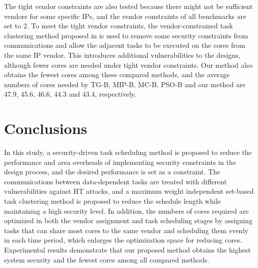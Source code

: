 \documentclass[10pt,journal, compsoc]{IEEEtran}
\begin{document}
The tight vendor constraints are also tested because there might not be sufficient vendors for some specific IPs, and the vendor constraints of all benchmarks are set to 2. To meet the tight vendor constraints, the vendor-constrained task clustering method proposed in \cite{article:NW} is used to remove some security constraints from communications and allow the adjacent tasks to be executed on the cores from the same IP vendor. This introduces additional vulnerabilities to the designs, although fewer cores are needed under tight vendor constraints. Our method also obtains the fewest cores among these compared methods, and the average numbers of cores needed by TG-B, MIP-B, MC-B, PSO-B and our method are 47.9, 45.6, 46.6, 44.3 and 43.4, respectively.






\section{Conclusions}

In this study, a security-driven task scheduling method is proposed to reduce the performance and area overheads of implementing security constraints in the design process, and the desired performance is set as a constraint. The communications between data-dependent tasks are treated with different vulnerabilities against HT attacks, and a maximum weight independent set-based task clustering method is proposed to reduce the schedule length while maintaining a high security level. In addition, the numbers of cores required are optimized in both the vendor assignment and task scheduling stages by assigning tasks that can share most cores to the same vendor and scheduling them evenly in each time period, which enlarges the optimization space for reducing cores. Experimental results demonstrate that our proposed method obtains the highest system security and the fewest cores among all compared methods.
\end{document}
